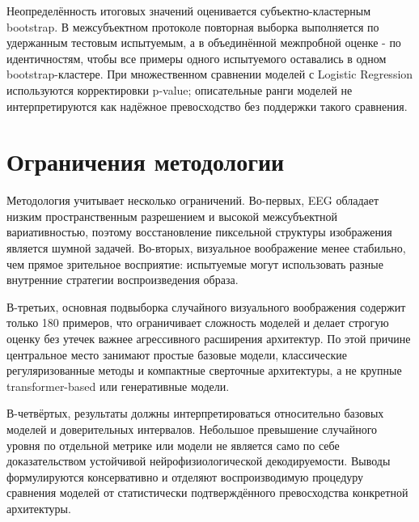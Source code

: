Неопределённость итоговых значений оценивается субъектно-кластерным bootstrap.
В межсубъектном протоколе повторная выборка выполняется по удержанным тестовым
испытуемым, а в объединённой межпробной оценке - по идентичностям, чтобы все
примеры одного испытуемого оставались в одном bootstrap-кластере. При
множественном сравнении моделей с Logistic Regression используются
корректировки p-value; описательные ранги моделей не интерпретируются как
надёжное превосходство без поддержки такого сравнения.

\section{Ограничения методологии}

Методология учитывает несколько ограничений. Во-первых, EEG обладает низким
пространственным разрешением и высокой межсубъектной вариативностью, поэтому
восстановление пиксельной структуры изображения является шумной задачей.
Во-вторых, визуальное воображение менее стабильно, чем прямое зрительное
восприятие: испытуемые могут использовать разные внутренние стратегии
воспроизведения образа.

В-третьих, основная подвыборка случайного визуального воображения содержит только 180 примеров, что
ограничивает сложность моделей и делает строгую оценку без утечек важнее
агрессивного расширения архитектур. По этой причине центральное место занимают
простые базовые модели, классические регуляризованные методы и компактные
сверточные архитектуры, а не крупные transformer-based или генеративные
модели.

В-четвёртых, результаты должны интерпретироваться относительно базовых моделей и
доверительных интервалов. Небольшое превышение случайного уровня по отдельной
метрике или модели не является само по себе доказательством устойчивой
нейрофизиологической декодируемости. Выводы формулируются консервативно и
отделяют воспроизводимую процедуру сравнения моделей от статистически
подтверждённого превосходства конкретной архитектуры.
